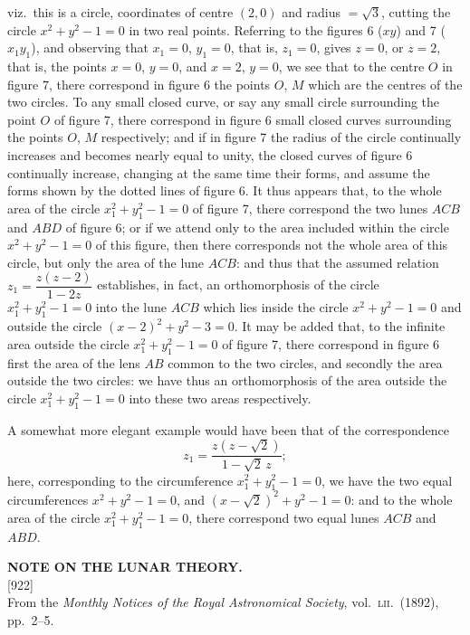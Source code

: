 \documentclass[11pt,a4paper]{article}
\newcommand{\paper}[3]{%
  \clearpage
  \begin{center}
    {\large\bfseries #2}\\[0.5em]
    {\small [#1]}\\[0.3em]
    {\small #3}
  \end{center}
  \vspace{0.5em}
}
\begin{document}
viz.\ this is a circle, coordinates of centre $(2, 0)$ and radius $=\sqrt{3}$, cutting the circle $x^2 + y^2 - 1 = 0$ in two real points. Referring to the figures 6 ($xy$) and 7 ($x_1 y_1$), and observing that $x_1 = 0$, $y_1 = 0$, that is, $z_1 = 0$, gives $z = 0$, or $z = 2$, that is, the points $x = 0$, $y = 0$, and $x = 2$, $y = 0$, we see that to the centre $O$ in figure 7, there correspond in figure 6 the points $O$, $M$ which are the centres of the two circles. To any small closed curve, or say any small circle surrounding the point $O$ of figure 7, there correspond in figure 6 small closed curves surrounding the points $O$, $M$ respectively; and if in figure 7 the radius of the circle continually increases and becomes nearly equal to unity, the closed curves of figure 6 continually increase, changing at the same time their forms, and assume the forms shown by the dotted lines of figure 6. It thus appears that, to the whole area of the circle $x_1^2 + y_1^2 - 1 = 0$ of figure 7, there correspond the two lunes $ACB$ and $ABD$ of figure 6; or if we attend only to the area included within the circle $x^2 + y^2 - 1 = 0$ of this figure, then there corresponds not the whole area of this circle, but only the area of the lune $ACB$: and thus that the assumed relation $z_1 = \dfrac{z(z-2)}{1-2z}$ establishes, in fact, an orthomorphosis of the circle $x_1^2 + y_1^2 - 1 = 0$ into the lune $ACB$ which lies inside the circle $x^2 + y^2 - 1 = 0$ and outside the circle $(x-2)^2 + y^2 - 3 = 0$. It may be added that, to the infinite area outside the circle $x_1^2 + y_1^2 - 1 = 0$ of figure 7, there correspond in figure 6 first the area of the lens $AB$ common to the two circles, and secondly the area outside the two circles: we have thus an orthomorphosis of the area outside the circle $x_1^2 + y_1^2 - 1 = 0$ into these two areas respectively.

\medskip

A somewhat more elegant example would have been that of the correspondence
\[
z_1 = \frac{z(z - \sqrt{2})}{1 - \sqrt{2}\,z};
\]
here, corresponding to the circumference $x_1^2 + y_1^2 - 1 = 0$, we have the two equal circumferences $x^2 + y^2 - 1 = 0$, and $(x - \sqrt{2})^2 + y^2 - 1 = 0$: and to the whole area of the circle $x_1^2 + y_1^2 - 1 = 0$, there correspond two equal lunes $ACB$ and $ABD$.

\paper{922}{NOTE ON THE LUNAR THEORY.}{From the \textit{Monthly Notices of the Royal Astronomical Society}, vol.\ \textsc{lii}.\ (1892), pp.\ 2--5.}
\end{document}
